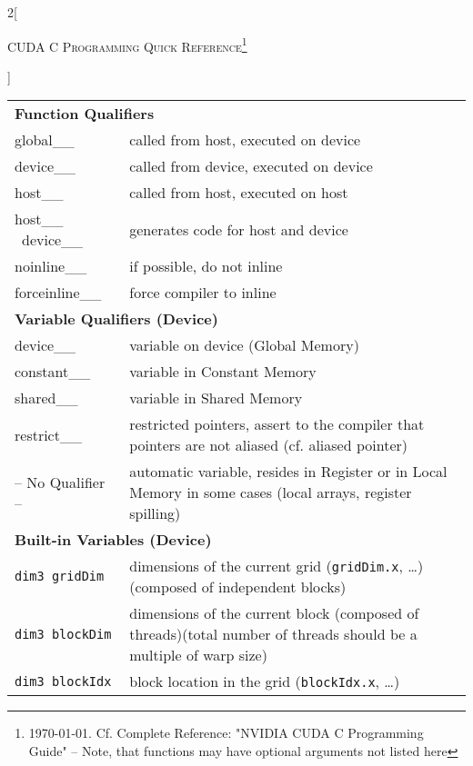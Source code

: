\documentclass[a4paper,10pt,landscape]{article}
\begin{document}
\raggedright
\setlength{\premulticols}{1pt}
\setlength{\postmulticols}{1pt}
\setlength{\multicolsep}{1pt}
\setlength{\columnsep}{10pt}

\begin{multicols*}{2}[\begin{center}\Large\textsc{CUDA C Programming Quick Reference\footnote{\today. Cf. Complete Reference: "NVIDIA CUDA C Programming Guide" -- Note, that functions may have optional arguments not listed here}}\end{center}]
%

\begin{tabular}{p{4cm}p{9cm}}
\multicolumn{2}{l}{\textbf{Function Qualifiers}} \\
\verb __global__ & called from host, executed on device\\
\verb __device__ & called from device, executed on device\\
\verb __host__ & called from host, executed on host\\
\verb __host__ \ \verb __device__ & generates code for host and device\\
\verb __noinline__ & if possible, do not inline\\
\verb __forceinline__ & force compiler to inline\\
\multicolumn{2}{l}{\textbf{Variable Qualifiers (Device)}} \\
\verb __device__ & variable on device (Global Memory)\\
\verb __constant__ & variable in Constant Memory\\
\verb __shared__ & variable in Shared Memory\\
\verb __restrict__ & restricted pointers, assert to the compiler that pointers are not aliased (cf. aliased pointer)\\
-- No Qualifier --& automatic variable, resides in Register or in Local Memory in some cases (local arrays, register spilling) \\
\multicolumn{2}{l}{\textbf{Built-in Variables (Device)}} \\
\lstinline$dim3 gridDim$ & dimensions of the current grid (\lstinline$gridDim.x$, \ldots)\newline(composed of independent blocks)\\
\lstinline$dim3 blockDim$ & dimensions of the current block (composed of threads)\newline(total number of threads should be a multiple of warp size)\\
\lstinline$dim3 blockIdx$ & block location in the grid (\lstinline$blockIdx.x$, \ldots)\\

\end{tabular}
\end{multicols*}
\end{document}
